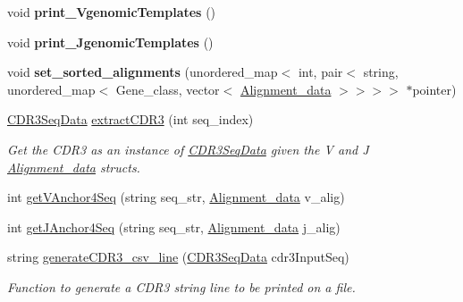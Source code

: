 \begin{DoxyCompactItemize}
\mbox{\label{classExtractFeatures_ac04edfcc22b8b13bdfe24f8786f26df5}} 
void {\bfseries print\+\_\+\+Vgenomic\+Templates} ()
\item 
\mbox{\label{classExtractFeatures_a29cb642660337a3fbaa0446d835ef1fa}} 
void {\bfseries print\+\_\+\+Jgenomic\+Templates} ()
\item 
\mbox{\label{classExtractFeatures_a79fcd50fc536ec897d7bae410afa1284}} 
void {\bfseries set\+\_\+sorted\+\_\+alignments} (unordered\+\_\+map$<$ int, pair$<$ string, unordered\+\_\+map$<$ Gene\+\_\+class, vector$<$ \hyperlink{structAlignment__data}{Alignment\+\_\+data} $>$$>$$>$$>$ $\ast$pointer)
\item 
\hyperlink{classCDR3SeqData}{C\+D\+R3\+Seq\+Data} \hyperlink{classExtractFeatures_af1dc5d4f1cb7e15227fbafcd2df662d2}{extract\+C\+D\+R3} (int seq\+\_\+index)
\begin{DoxyCompactList}\small\item\em Get the C\+D\+R3 as an instance of \hyperlink{classCDR3SeqData}{C\+D\+R3\+Seq\+Data} given the V and J \hyperlink{structAlignment__data}{Alignment\+\_\+data} structs. \end{DoxyCompactList}\item 
int \hyperlink{classExtractFeatures_a5d1a024949397722223c20d3fc5e6fd4}{get\+V\+Anchor4\+Seq} (string seq\+\_\+str, \hyperlink{structAlignment__data}{Alignment\+\_\+data} v\+\_\+alig)
\item 
int \hyperlink{classExtractFeatures_a5738a890c09d3cb72ea01693f624b593}{get\+J\+Anchor4\+Seq} (string seq\+\_\+str, \hyperlink{structAlignment__data}{Alignment\+\_\+data} j\+\_\+alig)
\item 
string \hyperlink{classExtractFeatures_aa117a4841d8db720b13c0e0b9028579d}{generate\+C\+D\+R3\+\_\+csv\+\_\+line} (\hyperlink{classCDR3SeqData}{C\+D\+R3\+Seq\+Data} cdr3\+Input\+Seq)
\begin{DoxyCompactList}\small\item\em Function to generate a C\+D\+R3 string line to be printed on a file. \end{DoxyCompactList}\end{DoxyCompactItemize}
